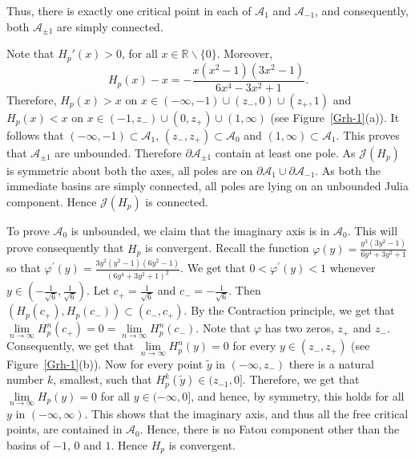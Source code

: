 \documentclass[12pt]{article}
\begin{document}
\begin{enumerate}[(I)]
Thus, there is exactly one critical point in each of $\mathcal{A}_{1}$ and $\mathcal{A}_{-1}$, and consequently, both $\mathcal{A}_{\pm 1}$ are simply connected.
\par
Note that $H_{p}'(x)>0$, for all
$ x \in \mathbb{R} \backslash\{0\} .
$ Moreover, $$H_{p}(x)-x=-\frac{x\left(x^{2}-1\right)\left(3 x^{2}-1\right)}{6 x^{4}-3 x^{2}+1}.$$
Therefore, $H_{p}(x)>x$ on $x \in(-\infty,-1) \cup\left(z_-, 0\right) \cup\left(z_+, 1\right)$
and $H_{p}(x)<x$ on $x \in\left(-1,z_-\right) \cup\left(0, z_+\right) \cup(1, \infty)$ (see Figure~\ref{Grh-1}(a)). It follows that
$ (-\infty,-1) \subset \mathcal{A}_{1} $, $\left(z_-,z_+\right) \subset \mathcal{A}_{0} $ and $ (1, \infty) \subset \mathcal{A}_{1}.$
This proves that $\mathcal{A}_{ \pm 1}$ are unbounded.
Therefore $\partial \mathcal{A}_{ \pm 1}$ contain at least one pole.
As $\mathcal{J}\left(H_{p}\right)$ is symmetric about both the axes, all poles are on $\partial \mathcal{A}_{1} \cup \partial \mathcal{A}_{-1}$.
As both the immediate basins are simply connected, all poles are lying on an unbounded Julia component. Hence $\mathcal{J}(H_p)$ is connected.
\par
To prove $\mathcal{A}_0$ is unbounded, we claim that the imaginary axis is in $\mathcal{A}_0$. This will prove consequently that $H_p$ is convergent. Recall the function $\varphi(y)=\frac{y^{3}\left(3 y^{2}-1\right)}{6 y^{4}+3 y^{2}+1}$ so that $\varphi^{\prime}(y)=\frac{3 y^{2}\left(y^{2}-1\right)\left(6 y^{2}-1\right)}{\left(6 y^{4}+3 y^{2}+1\right)^{2}}$.
We get that $0<\varphi^{\prime}(y)<1$ whenever $y \in(-\frac{1}{\sqrt{6}}, \frac{1}{\sqrt{6}})$.
Let $c_{+}=\frac{1}{\sqrt{6}}$ and $c_{-}=-\frac{1}{\sqrt{6}}$.
Then $\left(H_{p}\left(c_{+}\right), H_{p}\left(c_{-}\right)\right) \subset\left(c_{-}, c_{+}\right)$.
By the Contraction principle, we get that
$
\lim\limits_{n \rightarrow \infty} H_{p}^{n}\left(c_{+}\right)=0=\lim \limits_{n \rightarrow \infty} H_{p}^{n}\left(c_{-}\right) .
$
Note that $\varphi$ has two zeros, $z_{+}$ and $z_{-}$.
Consequently, we get that $ \lim \limits_{n \to \infty} H_{p}^{n}(y)=0$ for every $y \in\left(z_{-}, z_{+}\right)$ (see Figure~\ref{Grh-1}(b)).
Now for every point $\tilde{y}$ in $\left(-\infty, z_{-}\right)$ there is a natural number $ k$, smallest, such that $H_{p}^{k}(\tilde{y}) \in (z_{-1}, 0]$. Therefore, we get that
$\lim\limits _{n \to \infty} H_{p}(y)=0$ for all $ y \in(-\infty, 0]$, and hence, by symmetry, this holds for all $y$ in $(-\infty, \infty)$.
This shows that the imaginary axis, and thus all the free critical points, are contained in $\mathcal{A}_0$. Hence, there is no Fatou component other than the basins of $-1$, $0$ and $1$. Hence $H_p$ is convergent.

\end{enumerate}
\end{document}
